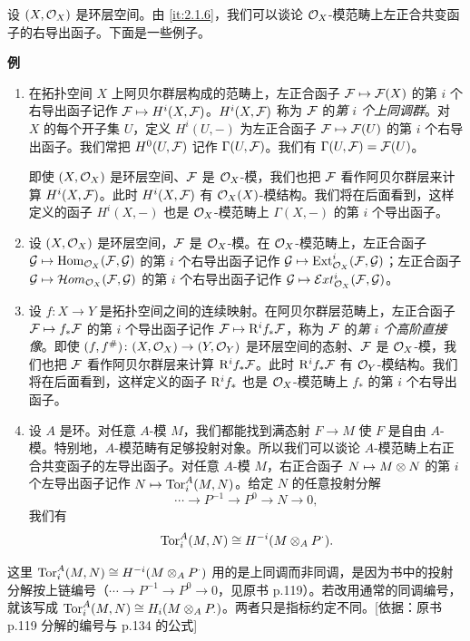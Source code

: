 设 $(X,\mathcal{O}_X)$ 是环层空间。由 \ref{it:2.1.6}，我们可以谈论 $\mathcal{O}_X$-模范畴上左正合共变函子的右导出函子。下面是一些例子。

\noindent\textbf{例}
\begin{enumerate}[label=\arabic*.,leftmargin=2.4em,itemsep=0.3em]
  \item 在拓扑空间 $X$ 上阿贝尔群层构成的范畴上，左正合函子 $\mathcal{F}\mapsto\mathcal{F}(X)$ 的第 $i$ 个右导出函子记作 $\mathcal{F}\mapsto H^i(X,\mathcal{F})$。$H^i(X,\mathcal{F})$ 称为 $\mathcal{F}$ 的\emph{第 $i$ 个上同调群}。对 $X$ 的每个开子集 $U$，定义 $H^i(U,-)$ 为左正合函子 $\mathcal{F}\mapsto\mathcal{F}(U)$ 的第 $i$ 个右导出函子。我们常把 $H^0(U,\mathcal{F})$ 记作 $\Gamma(U,\mathcal{F})$。我们有 $\Gamma(U,\mathcal{F})=\mathcal{F}(U)$。

  即使 $(X,\mathcal{O}_X)$ 是环层空间、$\mathcal{F}$ 是 $\mathcal{O}_X$-模，我们也把 $\mathcal{F}$ 看作阿贝尔群层来计算 $H^i(X,\mathcal{F})$。此时 $H^i(X,\mathcal{F})$ 有 $\mathcal{O}_X(X)$-模结构。我们将在后面看到，这样定义的函子 $H^i(X,-)$ 也是 $\mathcal{O}_X$-模范畴上 $\Gamma(X,-)$ 的第 $i$ 个导出函子。
  \item 设 $(X,\mathcal{O}_X)$ 是环层空间，$\mathcal{F}$ 是 $\mathcal{O}_X$-模。在 $\mathcal{O}_X$-模范畴上，左正合函子 $\mathcal{G}\mapsto\operatorname{Hom}_{\mathcal{O}_X}(\mathcal{F},\mathcal{G})$ 的第 $i$ 个右导出函子记作 $\mathcal{G}\mapsto\operatorname{Ext}^i_{\mathcal{O}_X}(\mathcal{F},\mathcal{G})$；左正合函子 $\mathcal{G}\mapsto\mathcal{H}om_{\mathcal{O}_X}(\mathcal{F},\mathcal{G})$ 的第 $i$ 个右导出函子记作 $\mathcal{G}\mapsto\mathcal{E}xt^i_{\mathcal{O}_X}(\mathcal{F},\mathcal{G})$。
  \item 设 $f\colon X\to Y$ 是拓扑空间之间的连续映射。在阿贝尔群层范畴上，左正合函子 $\mathcal{F}\mapsto f_*\mathcal{F}$ 的第 $i$ 个导出函子记作 $\mathcal{F}\mapsto\mathrm{R}^if_*\mathcal{F}$，称为 $\mathcal{F}$ 的\emph{第 $i$ 个高阶直接像}。即使 $(f,f^\#)\colon(X,\mathcal{O}_X)\to(Y,\mathcal{O}_Y)$ 是环层空间的态射、$\mathcal{F}$ 是 $\mathcal{O}_X$-模，我们也把 $\mathcal{F}$ 看作阿贝尔群层来计算 $\mathrm{R}^if_*\mathcal{F}$。此时 $\mathrm{R}^if_*\mathcal{F}$ 有 $\mathcal{O}_Y$-模结构。我们将在后面看到，这样定义的函子 $\mathrm{R}^if_*$ 也是 $\mathcal{O}_X$-模范畴上 $f_*$ 的第 $i$ 个右导出函子。
  \item 设 $A$ 是环。对任意 $A$-模 $M$，我们都能找到满态射 $F\to M$ 使 $F$ 是自由 $A$-模。特别地，$A$-模范畴有足够投射对象。所以我们可以谈论 $A$-模范畴上右正合共变函子的左导出函子。对任意 $A$-模 $M$，右正合函子 $N\mapsto M\otimes N$ 的第 $i$ 个左导出函子记作 $N\mapsto\operatorname{Tor}_i^A(M,N)$。给定 $N$ 的任意投射分解
  \[
  \cdots\to P^{-1}\to P^0\to N\to 0,
  \]
  我们有
  \[
  \operatorname{Tor}_i^A(M,N)\cong H^{-i}(M\otimes_A P^\cdot).
  \]
\end{enumerate}
\begin{tnote}
这里 $\operatorname{Tor}_i^A(M,N)\cong H^{-i}(M\otimes_AP^\cdot)$ 用的是上同调而非同调，是因为书中的投射分解按上链编号（$\cdots\to P^{-1}\to P^0\to0$，见原书 p.119）。若改用通常的同调编号，就该写成 $\operatorname{Tor}_i^A(M,N)\cong H_i(M\otimes_AP_\cdot)$。两者只是指标约定不同。[依据：原书 p.119 分解的编号与 p.134 的公式]
\end{tnote}

